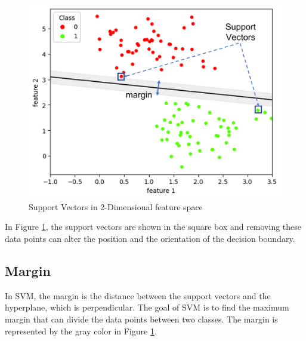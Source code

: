 \begin{figure}[!h]
  \centering
  \includegraphics[width=8.0 cm]{svm_sv.png}
  \caption{Support Vectors in 2-Dimensional feature space}
  \label{fig:svm_SV}
\end{figure}

In Figure \ref{fig:svm_SV}, the support vectors are shown in the square box and removing these data points can alter the position and the orientation of the decision boundary.



%

\subsection{Margin}
In SVM, the margin is the distance between the support vectors and the hyperplane, which is perpendicular. The goal of SVM is to find the maximum margin that can divide the data points between two classes. The margin is represented by the gray color in Figure \ref{fig:svm_SV}.


